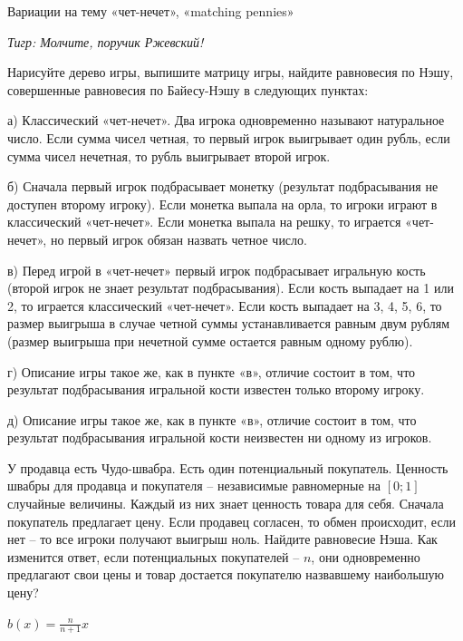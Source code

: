 \begin{problem}
 Вариации на тему «чет-нечет», «matching pennies»\par
{\it Тигр: Молчите, поручик Ржевский!}\par
Нарисуйте дерево игры, выпишите матрицу игры, найдите равновесия по Нэшу, совершенные равновесия по Байесу-Нэшу в следующих пунктах:\par
а) Классический «чет-нечет». Два игрока одновременно называют натуральное число. Если сумма чисел четная, то первый игрок выигрывает один рубль, если сумма чисел нечетная, то рубль выигрывает второй игрок.\par
б) Сначала первый игрок подбрасывает монетку (результат подбрасывания не доступен второму игроку). Если монетка выпала на орла, то игроки играют в классический «чет-нечет». Если монетка выпала на решку, то играется «чет-нечет», но первый игрок обязан назвать четное число.\par
в) Перед игрой в «чет-нечет» первый игрок подбрасывает игральную кость (второй игрок не знает результат подбрасывания). Если кость выпадает на 1 или 2, то играется классический «чет-нечет». Если кость выпадает на 3, 4, 5, 6, то размер выигрыша в случае четной суммы устанавливается равным двум рублям (размер выигрыша при нечетной сумме остается равным одному рублю).\par
г) Описание игры такое же, как в пункте «в», отличие состоит в том, что результат подбрасывания игральной кости известен только второму игроку.\par
д) Описание игры такое же, как в пункте «в», отличие состоит в том, что результат подбрасывания игральной кости неизвестен ни одному из игроков.



\begin{sol}

\end{sol}
\end{problem}






\begin{problem}
У продавца есть Чудо-швабра. Есть один потенциальный покупатель. Ценность швабры для продавца и покупателя -- независимые равномерные на $[0;1]$ случайные величины. Каждый из них знает ценность товара для себя. Сначала покупатель предлагает цену. Если продавец согласен, то обмен происходит, если нет -- то все игроки получают выигрыш ноль. Найдите равновесие Нэша. Как изменится ответ, если потенциальных покупателей -- $n$, они одновременно предлагают свои цены и товар достается покупателю назвавшему наибольшую цену?



\begin{sol}
$b(x)=\frac{n}{n+1}x$
\end{sol}
\end{problem}

